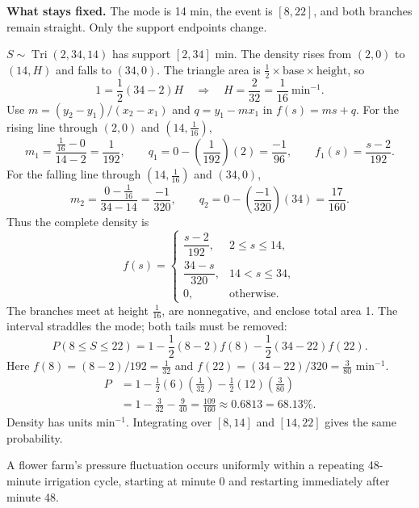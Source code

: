 \textbf{What stays fixed.} The mode is 14 min, the event is $[8,22]$, and both branches remain straight. Only the support endpoints change.\par
{}
$S\sim\operatorname{Tri}(2,34,14)$ has support $[2,34]$ min. The density rises from $(2,0)$ to $(14,H)$ and falls to $(34,0)$.
The triangle area is $\tfrac12\times\text{base}\times\text{height}$, so
\[1=\frac12(34-2)H\quad\Longrightarrow\quad H=\frac2{32}=\frac{1}{16}\ \mathrm{min}^{-1}.\]
Use $m=(y_2-y_1)/(x_2-x_1)$ and $q=y_1-mx_1$ in $f(s)=ms+q$.
For the rising line through $(2,0)$ and $(14,\frac{1}{16})$,
\[m_1=\frac{\frac{1}{16}-0}{14-2}=\frac{1}{192},\qquad q_1=0-(\frac{1}{192})(2)=\frac{-1}{96},\qquad f_1(s)=\frac{s-2}{192}.\]
For the falling line through $(14,\frac{1}{16})$ and $(34,0)$,
\[m_2=\frac{0-\frac{1}{16}}{34-14}=\frac{-1}{320},\qquad q_2=0-(\frac{-1}{320})(34)=\frac{17}{160}.\]
Thus the complete density is
\[f(s)=\begin{cases}\dfrac{s-2}{192},&2\le s\le14,\\[1mm]\dfrac{34-s}{320},&14<s\le34,\\[1mm]0,&\text{otherwise}.\end{cases}\]
The branches meet at height $\frac{1}{16}$, are nonnegative, and enclose total area 1.
\Needspace{10cm}
The interval straddles the mode; both tails must be removed:
\[P(8\le S\le22)=1-\frac12(8-2)f(8)-\frac12(34-22)f(22).\]
Here $f(8)=(8-2)/192=\frac{1}{32}$ and $f(22)=(34-22)/320=\frac{3}{80}$ min$^{-1}$.
\[\begin{aligned}P&=1-\tfrac12(6)(\frac{1}{32})-\tfrac12(12)(\frac{3}{80})\\
&=1-\frac{3}{32}-\frac{9}{40}=\boxed{\frac{109}{160}\approx0.6813=68.13\%}.\end{aligned}\]
Density has units min$^{-1}$. Integrating over $[8,14]$ and $[14,22]$ gives the same probability.

\clearpage\def\CurrentProblem{cycle}
A flower farm's pressure fluctuation occurs uniformly within a repeating 48-minute irrigation cycle, starting at minute 0 and restarting immediately after minute 48.

